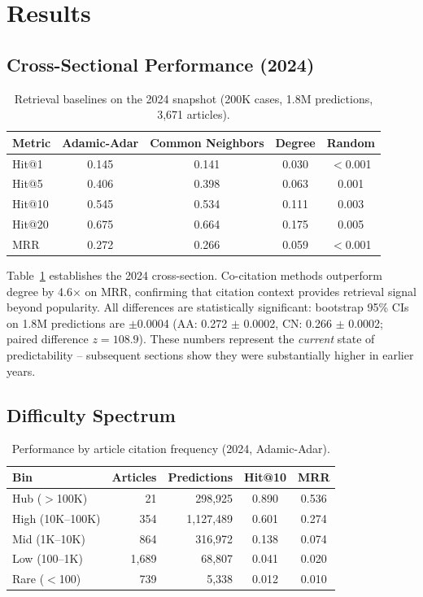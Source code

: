 \documentclass[11pt]{article}
\begin{document}
\section{Results}
\label{sec:results}

\subsection{Cross-Sectional Performance (2024)}

\begin{table}[t]
\centering
\small
\caption{Retrieval baselines on the 2024 snapshot (200K cases, 1.8M predictions, 3{,}671 articles).}
\label{tab:main}
\begin{tabular}{@{}l cccc@{}}
\toprule
\textbf{Metric} & \textbf{Adamic-Adar} & \textbf{Common Neighbors} & \textbf{Degree} & \textbf{Random} \\
\midrule
Hit@1  & 0.145 & 0.141 & 0.030 & $<$0.001 \\
Hit@5  & 0.406 & 0.398 & 0.063 & 0.001 \\
Hit@10 & 0.545 & 0.534 & 0.111 & 0.003 \\
Hit@20 & 0.675 & 0.664 & 0.175 & 0.005 \\
MRR    & 0.272 & 0.266 & 0.059 & $<$0.001 \\
\bottomrule
\end{tabular}
\end{table}

Table~\ref{tab:main} establishes the 2024 cross-section.
Co-citation methods outperform degree by 4.6$\times$ on MRR, confirming that citation context provides retrieval signal beyond popularity.
All differences are statistically significant: bootstrap 95\% CIs on 1.8M predictions are $\pm$0.0004 (AA: 0.272 $\pm$ 0.0002, CN: 0.266 $\pm$ 0.0002; paired difference $z = 108.9$).
These numbers represent the \emph{current} state of predictability -- subsequent sections show they were substantially higher in earlier years.

\subsection{Difficulty Spectrum}

\begin{table}[t]
\centering
\small
\caption{Performance by article citation frequency (2024, Adamic-Adar).}
\label{tab:difficulty}
\begin{tabular}{@{}l r r cc@{}}
\toprule
\textbf{Bin} & \textbf{Articles} & \textbf{Predictions} & \textbf{Hit@10} & \textbf{MRR} \\
\midrule
Hub ($>$100K)     &    21 &  298{,}925 & 0.890 & 0.536 \\
High (10K--100K)  &   354 & 1{,}127{,}489 & 0.601 & 0.274 \\
Mid (1K--10K)     &   864 &  316{,}972 & 0.138 & 0.074 \\
Low (100--1K)     & 1{,}689 &   68{,}807 & 0.041 & 0.020 \\
Rare ($<$100)     &   739 &    5{,}338 & 0.012 & 0.010 \\
\bottomrule
\end{tabular}
\end{table}
\end{document}
